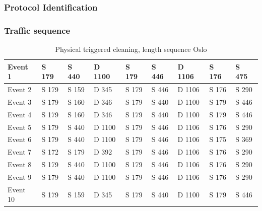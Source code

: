 \subsubsection{Protocol Identification}

\subsubsection{Traffic sequence}

\begin{table}[H]
\centering
\caption{Physical triggered cleaning, length sequence Oslo}
\label{tab:PCSequenceOslo}
\begin{tabular}{|l|l|l|l|l|l|l|l|l|}
\hline
Event 1  & S 179 & S 440 & D 1100 & S 179 & S 446 & D 1106 & S 176 & S 475 \\ \hline
Event 2  & S 179 & S 159 & D 345  & S 179 & S 446 & D 1106 & S 176 & S 290 \\ \hline
Event 3  & S 179 & S 160 & D 346  & S 179 & S 440 & D 1100 & S 179 & S 446 \\ \hline
Event 4  & S 179 & S 160 & D 346  & S 179 & S 440 & D 1100 & S 179 & S 446 \\ \hline
Event 5  & S 179 & S 440 & D 1100 & S 179 & S 446 & D 1106 & S 176 & S 290 \\ \hline
Event 6  & S 179 & S 440 & D 1100 & S 179 & S 446 & D 1106 & S 175 & S 369 \\ \hline
Event 7  & S 172 & S 179 & D 392  & S 179 & S 446 & D 1106 & S 176 & S 290 \\ \hline
Event 8  & S 179 & S 440 & D 1100 & S 179 & S 446 & D 1106 & S 176 & S 290 \\ \hline
Event 9  & S 179 & S 440 & D 1100 & S 179 & S 446 & D 1106 & S 176 & S 290 \\ \hline
Event 10 & S 179 & S 159 & D 345  & S 179 & S 440 & D 1100 & S 179 & S 446 \\ \hline
\end{tabular}
\end{table}

